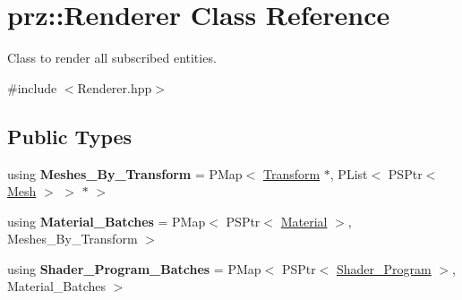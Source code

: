 \hypertarget{classprz_1_1_renderer}{}\section{prz\+::Renderer Class Reference}
\label{classprz_1_1_renderer}


Class to render all subscribed entities.  




{\ttfamily \#include $<$Renderer.\+hpp$>$}

\subsection*{Public Types}
\begin{DoxyCompactItemize}
\item 
\mbox{\label{classprz_1_1_renderer_a238a312cfc99589491e7bab525aed05a}} 
using {\bfseries Meshes\+\_\+\+By\+\_\+\+Transform} = P\+Map$<$ \mbox{\hyperlink{classprz_1_1_transform}{Transform}} $\ast$, P\+List$<$ P\+S\+Ptr$<$ \mbox{\hyperlink{classprz_1_1_mesh}{Mesh}} $>$ $>$ $\ast$ $>$
\item 
\mbox{\label{classprz_1_1_renderer_a1d8fb1bc716e17e7e509d7692bc3b2ca}} 
using {\bfseries Material\+\_\+\+Batches} = P\+Map$<$ P\+S\+Ptr$<$ \mbox{\hyperlink{classprz_1_1_material}{Material}} $>$, Meshes\+\_\+\+By\+\_\+\+Transform $>$
\item 
\mbox{\label{classprz_1_1_renderer_aaaf8bf1a30a10c59853ef9f45f8aa6e6}} 
using {\bfseries Shader\+\_\+\+Program\+\_\+\+Batches} = P\+Map$<$ P\+S\+Ptr$<$ \mbox{\hyperlink{classprz_1_1_shader___program}{Shader\+\_\+\+Program}} $>$, Material\+\_\+\+Batches $>$
\end{DoxyCompactItemize}

